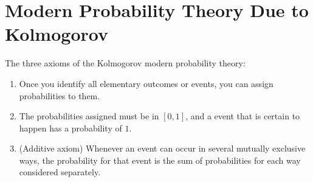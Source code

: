 \documentclass[12pt]{article}
\begin{document}
\section{Modern Probability Theory Due to Kolmogorov}
\begin{definition}\label{defn:kol-prob}
The three axioms of the Kolmogorov modern probability theory:
\begin{enumerate}
    \item Once you identify all elementary outcomes or events, you can assign probabilities to them.
    \item The probabilities assigned must be in $[0,1]$, and a event that is certain to happen has a probability of $1$.
    \item (Additive axiom) Whenever an event can occur in several mutually exclusive ways, the probability for that event is the sum of probabilities for each way considered separately.
\end{enumerate}
\end{definition}
\end{document}
